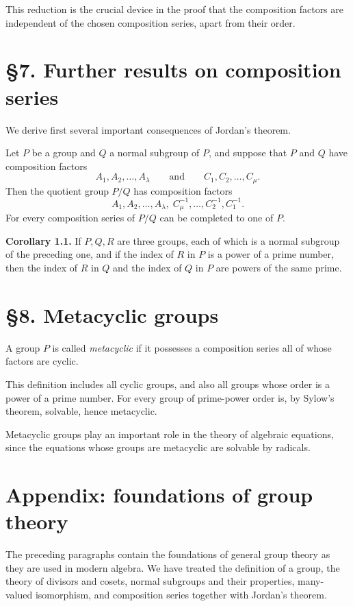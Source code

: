 \documentclass[11pt]{article}
\begin{document}
This reduction is the crucial device in the proof that the composition factors are independent of the chosen composition series, apart from their order.

\clearpage

\section*{\S 7. Further results on composition series}

We derive first several important consequences of Jordan's theorem.

Let $P$ be a group and $Q$ a normal subgroup of $P$, and suppose that $P$ and $Q$ have composition factors
\[
A_1,A_2,\dots,A_\lambda
\qquad\text{and}\qquad
C_1,C_2,\dots,C_\mu.
\]
Then the quotient group $P/Q$ has composition factors
\[
A_1,A_2,\dots,A_\lambda,\; C_\mu^{-1},\dots,C_2^{-1},C_1^{-1}.
\]
For every composition series of $P/Q$ can be completed to one of $P$.

\medskip
\noindent\textbf{Corollary 1.1.}
If $P,Q,R$ are three groups, each of which is a normal subgroup of the preceding one, and if the index of $R$ in $P$ is a power of a prime number, then the index of $R$ in $Q$ and the index of $Q$ in $P$ are powers of the same prime.

\section*{\S 8. Metacyclic groups}

A group $P$ is called \emph{metacyclic} if it possesses a composition series all of whose factors are cyclic.

This definition includes all cyclic groups, and also all groups whose order is a power of a prime number. For every group of prime-power order is, by Sylow's theorem, solvable, hence metacyclic.

Metacyclic groups play an important role in the theory of algebraic equations, since the equations whose groups are metacyclic are solvable by radicals.

\section*{Appendix: foundations of group theory}

The preceding paragraphs contain the foundations of general group theory as they are used in modern algebra. We have treated the definition of a group, the theory of divisors and cosets, normal subgroups and their properties, many-valued isomorphism, and composition series together with Jordan's theorem.
\end{document}
